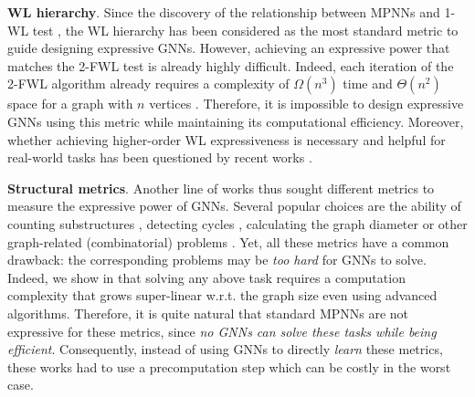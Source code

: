 \documentclass{article} %
\let\cref\crtcref
\begin{document}
\textbf{WL hierarchy}. Since the discovery of the relationship between MPNNs and 1-WL test \citep{xu2019powerful,morris2019weisfeiler}, the WL hierarchy has been considered as the most standard metric to guide designing expressive GNNs. However, achieving an expressive power that matches the 2-FWL test is already highly difficult. Indeed, each iteration of the 2-FWL algorithm already requires a complexity of $\Omega(n^3)$ time and $\Theta(n^2)$ space for a graph with $n$ vertices \citep{immerman1990describing}. Therefore, it is impossible to design expressive GNNs using this metric while maintaining its computational efficiency. Moreover, whether achieving higher-order WL expressiveness is necessary and helpful for real-world tasks has been questioned by recent works \citep{velivckovic2022message}.


\textbf{Structural metrics}. Another line of works thus sought different metrics to measure the expressive power of GNNs. Several popular choices are the ability of counting substructures \citep{arvind2020weisfeiler,chen2020can,bouritsas2022improving}, detecting cycles \citep{loukas2020graph,vignac2020building,huang2023boosting}, calculating the graph diameter \citep{garg2020generalization,loukas2020graph} or other graph-related (combinatorial) problems \citep{sato2019approximation}. Yet, all these metrics have a common drawback: the corresponding problems may be \emph{too hard} for GNNs to solve. Indeed, we show in \cref{tab:complexity} that solving any above task requires a computation complexity that grows super-linear w.r.t. the graph size even using advanced algorithms. Therefore, it is quite natural that standard MPNNs are not expressive for these metrics, since \emph{no GNNs can solve these tasks while being efficient}. Consequently, instead of using GNNs to directly \emph{learn} these metrics, these works had to use a precomputation step which can be costly in the worst case.
\end{document}
